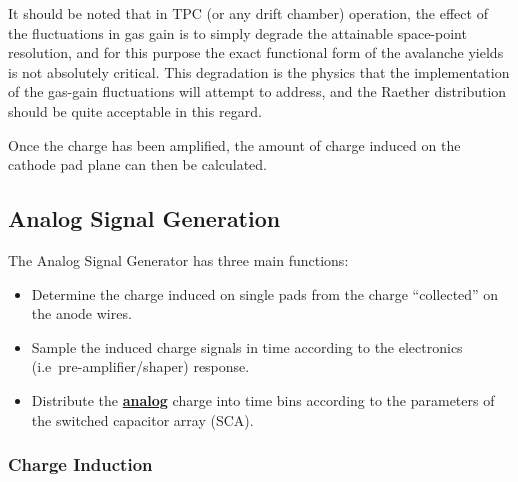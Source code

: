 \documentclass{article}
\begin{document}
It should be noted that in TPC (or any drift chamber) operation,
the effect of the fluctuations in gas gain is to simply degrade the
attainable space-point resolution, and for this purpose the exact
functional form of the avalanche yields is not absolutely critical.
This degradation is the physics that the implementation of the gas-gain
fluctuations will attempt to address, and the Raether distribution should
be quite acceptable in this regard.

Once the charge has been amplified, the amount of charge induced on
the cathode pad plane can then be calculated.

\subsection{Analog Signal Generation}

The Analog Signal Generator has three main functions:
\begin{itemize}
   \item Determine the charge induced on single pads from the charge
     ``collected'' on the anode wires.
   \item Sample the induced charge signals in time according to the
     electronics (i.e~pre-amplifier/shaper) response.
   \item Distribute the \underline{\bf analog} charge into time bins
     according to the parameters of the switched capacitor array (SCA).
   \end{itemize}

\subsubsection{Charge Induction}
\end{document}
